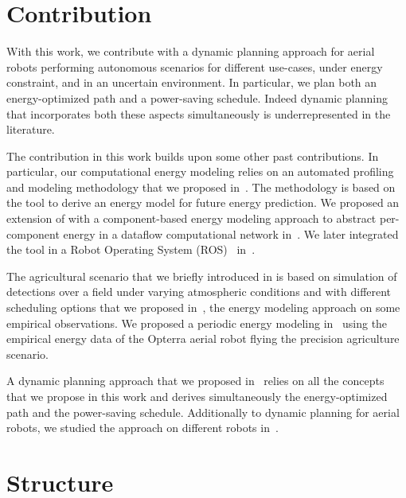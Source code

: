\section{Contribution}

With this work, we contribute with a dynamic planning approach for aerial robots performing autonomous scenarios for different use-cases, under energy constraint, and in an uncertain environment. In particular, we plan both an energy-optimized path and a power-saving schedule. Indeed dynamic planning that incorporates both these aspects simultaneously is underrepresented in the literature. 

The contribution in this work builds upon some other past contributions. In particular, our computational energy modeling relies on an automated profiling and modeling methodology that we proposed in~\citep{seewald2019coarse}. The methodology is based on the \powprof{} tool to derive an energy model for future energy prediction. We proposed an extension of \powprof{} with a component-based energy modeling approach to abstract per-component energy in a dataflow computational network in~\citep{seewald2019component}. We later integrated the tool in a Robot Operating System (ROS)~\citep{quigley2009ros} in~\citep{zamanakos2020energy}.

The agricultural scenario that we briefly introduced in  is based on simulation of detections over a field under varying atmospheric conditions and with different scheduling options that we proposed in~\citep{zamanakos2020energy}, the energy modeling approach on some empirical observations. We proposed a periodic energy modeling in~\citep{seewald2020mechanical} using the empirical energy data of the Opterra aerial robot flying the precision agriculture scenario. 

A dynamic planning approach that we proposed in~\citep{seewald202Xenergy} relies on all the concepts that we propose in this work and derives simultaneously the energy-optimized path and the power-saving schedule. Additionally to dynamic planning for aerial robots, we studied the approach on different robots in~\citep{seewald2020beyond}.


\section{Structure}
\label{sec:structure}

